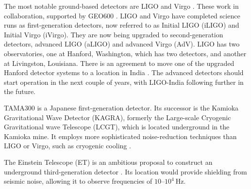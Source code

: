 The most notable ground-based detectors are LIGO and Virgo \citep{Abramovici1992,Acernese2008a}. These work in collaboration, supported by GEO600 \citep{Willke2002}. LIGO and Virgo have completed science runs as first-generation detectors, now referred to as Initial LIGO (iLIGO) and Initial Virgo (iVirgo). They are now being upgraded to second-generation detectors, advanced LIGO (aLIGO) and advanced Virgo (AdV).  LIGO has two observatories, one at Hanford, Washington, which has two detectors, and another at Livingston, Louisiana. There is an agreement to move one of the upgraded Hanford detector systems to a location in India \citep{LIGO-India,Unnikrishnan2013}. The advanced detectors should start operation in the next couple of years, with LIGO-India following further in the future.

TAMA300 is a Japanese first-generation detector. Its successor is the Kamioka Gravitational Wave Detector (KAGRA), formerly the Large-scale Cryogenic Gravitational wave Telescope (LCGT), which is located underground in the Kamioka mine. It employs more sophisticated noise-reduction techniques than LIGO or Virgo, such as cryogenic cooling \citep{2012CQGra..29l4007S}.

The Einstein Telescope (ET) is an ambitious proposal to construct an underground third-generation detector \citep{Punturo2010,Sathyaprakash2012}. Its location would provide shielding from seismic noise, allowing it to observe frequencies of $10$--$10^4~\mathrm{Hz}$. 

